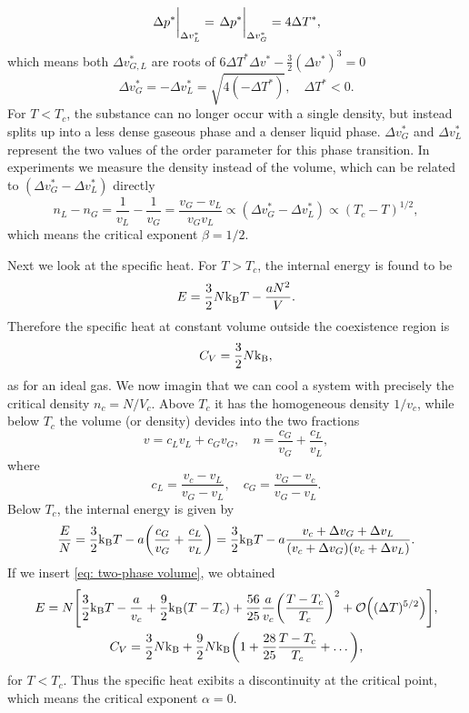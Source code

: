 \documentclass[10pt]{article}
\begin{document}
\begin{equation}
	\eval{\Delta p^*}_{\Delta v^*_L} = \eval{\Delta p^*}_{\Delta v^*_G} = 4 \Delta T^*,
\end{equation}
which means both $\Delta v^*_{G,L}$ are roots of $6 \Delta T^* \Delta v^* - \tfrac{3}{2} (\Delta v^*)^3 = 0$
\begin{equation}
	\Delta v^*_{G} = -\Delta v^*_{L} = \sqrt{4(-\Delta T^*)}, \quad \Delta T^* < 0. \label{eq: two-phase volume}
\end{equation}
For $T < T_c$, the substance can no longer occur with a single density, but instead splits up into a less dense gaseous phase and a denser liquid phase. $\Delta v^*_{G}$ and $\Delta v^*_{L}$ represent the two values of the order parameter for this phase transition. In experiments we measure the density instead of the volume, which can be related to $(\Delta v^*_{G} - \Delta v^*_{L})$ directly
\begin{equation}
	n_L - n_G = \frac{1}{v_L} - \frac{1}{v_G} = \frac{v_G - v_L}{v_G v_L} \propto (\Delta v^*_G - \Delta v^*_L) \propto (T_c - T)^{1/2},
\end{equation}
which means the critical exponent $\beta = 1/2$.

Next we look at the specific heat. For $T > T_c$, the internal energy is found to be
\begin{equation}
	E = \frac{3}{2}N {\mathrm{k_B}} T - \frac{aN^2}{V}.
\end{equation}
Therefore the specific heat at constant volume outside the coexistence region is
\begin{equation}
	C_V = \frac{3}{2}N{\mathrm{k_B}},
\end{equation}
as for an ideal gas. We now imagin that we can cool a system with precisely the critical density $n_c = N/V_c$. Above $T_c$ it has the homogeneous density $1/v_c$, while below $T_c$ the volume (or density) devides into the two fractions
\begin{equation}
	v = c_L v_L + c_G v_G, \quad n = \frac{c_G}{v_G} + \frac{c_L}{v_L},
\end{equation}
where
\begin{equation}
	c_L = \frac{v_c - v_L}{v_G - v_L}, \quad c_G = \frac{v_G - v_c}{v_G - v_L}.
\end{equation}
Below $T_c$, the internal energy is given by
\begin{equation}
	\frac{E}{N} = \frac{3}{2}{\mathrm{k_B}} T - a\qty(\frac{c_G}{v_G} + \frac{c_L}{v_L}) = \frac{3}{2}{\mathrm{k_B}} T - a \frac{v_c + \Delta v_G + \Delta v_L}{(v_c + \Delta v_G)(v_c + \Delta v_L)}.
\end{equation}
If we insert \eqref{eq: two-phase volume}, we obtained
\begin{gather}
	E = N\qty[\frac{3}{2}\kb T - \frac{a}{v_c} + \frac{9}{2}\kb (T - T_c) + \frac{56}{25}\frac{a}{v_c} \qty(\frac{T - T_c}{T_c})^2 + \order{(\Delta T)^{5/2}}], \\
	C_V = \frac{3}{2}N \kb + \frac{9}{2}N \kb \qty(1 + \frac{28}{25} \frac{T - T_c}{T_c} + \dots),
\end{gather}
for $T < T_c$. Thus the specific heat exibits a discontinuity at the critical point, which means the critical exponent $\alpha = 0$.
\end{document}
